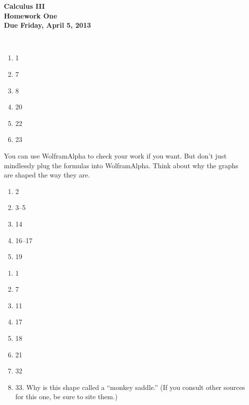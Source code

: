 \documentclass[12pt]{article}
\begin{document}
\pagestyle{empty}
 
\begin{center}
{\large {\bf Calculus III}}\\
\medskip
{\large {\bf Homework One}}\\
\medskip
{ {\bf Due Friday, April 5, 2013}}\\
\end{center}

\hspace{2mm}\\


\begin{enumerate}
\setlength{\itemsep}{-1mm}
  \item 1
  \item 7
  \item 8
  \item 20
  \item 22
  \item 23

\end{enumerate}


 You can use WolframAlpha to check your
work if you want. But don't just mindlessly plug the formulas into
WolframAlpha. Think about why the graphs are shaped the way they are.  

\begin{enumerate}
\setlength{\itemsep}{-1mm}
  \item 2
  \item 3--5
  \item 14
  \item 16--17
  \item 19

\end{enumerate}




\begin{enumerate}
\setlength{\itemsep}{-1mm}
  \item 1
  \item 7
  \item 11
  \item 17
  \item 18
  \item 21
  \item 32
  \item 33.  Why is this shape called a ``monkey saddle.''  (If you
    consult other sources for this one, be sure to site them.)

\end{enumerate}
\end{document}
